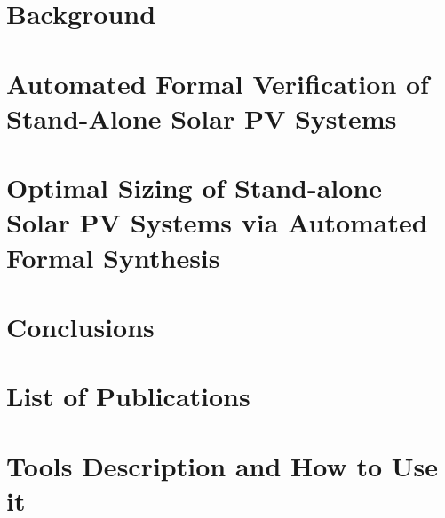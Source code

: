 \documentclass[12pt,twoside]{report}
\begin{document}
\chapter{Background}
\label{chap:background}


%
%
%

\chapter{Automated Formal Verification of Stand-Alone Solar PV Systems}
\label{chap:automatedverification}


\chapter{Optimal Sizing of Stand-alone Solar PV Systems via Automated Formal Synthesis}
\label{chap:automatedsynthesis}


\chapter{Conclusions}
\label{chap:conclusions}


\appendix
\chapter{List of Publications}
\label{chap:publications}

\chapter{Tools Description and How to Use it}
\label{chap:tools}


\renewcommand\bibname{References}
%
{}
\end{document}
